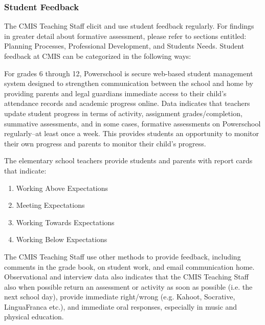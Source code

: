 \subsubsection{Student Feedback}



\begin{findings}
The CMIS Teaching Staff elicit and use student feedback regularly. For findings in greater detail about formative assessment, please refer to sections entitled: Planning Processes, Professional Development, and Students Needs. Student feedback at CMIS can be categorized in the following ways:


For grades 6 through 12, Powerschool is secure web-based student management system designed to strengthen communication between the school and home by providing parents and legal guardians immediate access to their child's attendance records and academic progress online. Data indicates that teachers update student progress in terms of activity, assignment grades/completion, summative assessments, and in some cases, formative assessments on Powerschool regularly--at least once a week. This provides students an opportunity to monitor their own progress and parents to monitor their child’s progress. 

The elementary school teachers provide students and parents with report cards that indicate:
\begin{enumerate}
\item  Working Above Expectations
\item  Meeting Expectations
\item  Working Towards Expectations
\item  Working Below Expectations
\end{enumerate}

The CMIS Teaching Staff  use other methods to provide feedback, including comments in the grade book, on student work, and email communication home. Observational and interview data also indicates that the CMIS Teaching Staff also when possible return an assessment or activity as soon as possible (i.e. the next school day), provide immediate right/wrong (e.g. Kahoot, Socrative, LinguaFranca etc.), and immediate oral responses, especially in music and physical education. 


\end{findings}
